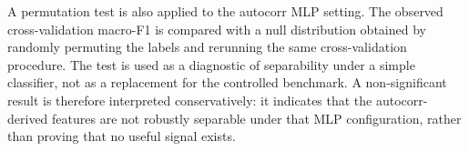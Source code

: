 A permutation test is also applied to the autocorr MLP setting. The observed
cross-validation macro-F1 is compared with a null distribution obtained by
randomly permuting the labels and rerunning the same cross-validation procedure.
The test is used as a diagnostic of separability under a simple classifier, not
as a replacement for the controlled benchmark. A non-significant result is
therefore interpreted conservatively: it indicates that the autocorr-derived
features are not robustly separable under that MLP configuration, rather than
proving that no useful signal exists.

